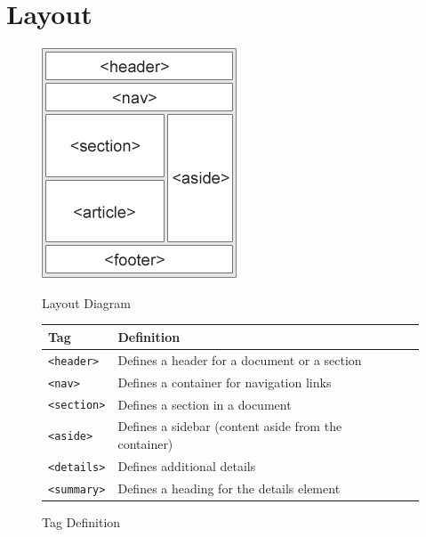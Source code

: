 \documentclass[11pt, letterpaper]{article}
\begin{document}
	\section{Layout}
		\begin{figure}[!h]
			\CenterFloatBoxes
			\begin{floatrow}
				\ffigbox
					{\includegraphics{layout}}
					{\caption{Layout Diagram}}
				\killfloatstyle
				\ttabbox
					{\begin{tabular}{l p{5cm} l}
						\toprule
						Tag & Definition \\\midrule
						\texttt{<header>} & Defines a header for a document or a section \\\midrule
						\texttt{<nav>} & Defines a container for navigation links \\\midrule
						\texttt{<section>} & Defines a section in a document \\\midrule
						\texttt{<aside>} & Defines a sidebar (content aside from the container) \\\midrule
						\texttt{<details>} & Defines additional details \\\midrule
						\texttt{<summary>} & Defines a heading for the details element \\
						\bottomrule
					\end{tabular}}
					{\caption{Tag Definition}}
			\end{floatrow}
		\end{figure}
\end{document}
